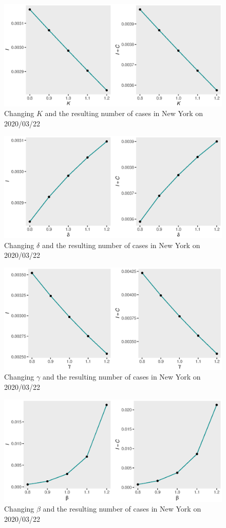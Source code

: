 \documentclass[nonblindrev, copyedit]{informs3a}
\begin{document}
\begin{figure}[htbp]
	\centering
 	\caption{Changing $K$ and the resulting number of cases in New York on 2020/03/22}
 	\label{fig:ny k}
	\includegraphics[width=0.75\linewidth, angle=0]{k.eps}
\end{figure}

\begin{figure}[htbp]
	\centering
 	\caption{Changing $\delta$ and the resulting number of cases in New York on 2020/03/22}
 	\label{fig:ny delta}
	\includegraphics[width=0.75\linewidth, angle=0]{delta.eps}
\end{figure}

\begin{figure}[t]
	\centering
 	\caption{Changing $\gamma$ and the resulting number of cases in New York on 2020/03/22}
 	\label{fig:ny gamma}
	\includegraphics[width=0.75\linewidth, angle=0]{gamma.eps}
\end{figure}



\begin{figure}[ht]
	\centering
 	\caption{Changing $\beta$ and the resulting number of cases in New York on 2020/03/22}
 	\label{fig:ny beta}
	\includegraphics[width=0.75\linewidth, angle=0]{beta.eps}
\end{figure}
\end{document}
